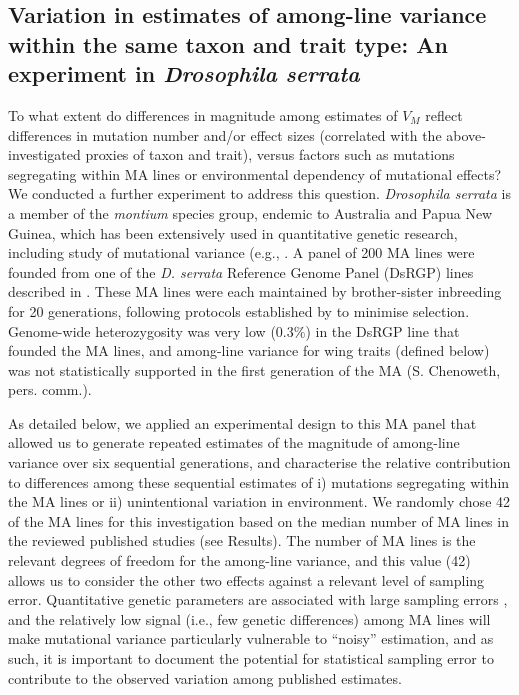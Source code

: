 \subsection{Variation in estimates of among-line variance within the same taxon and trait type: An experiment in \textit{Drosophila serrata}} 
To what extent do differences in magnitude among estimates of $V_M$ reflect differences in mutation number and/or effect sizes (correlated with the above-investigated proxies of taxon and trait), versus factors such as mutations segregating within MA lines or environmental dependency of mutational effects? We conducted a further experiment to address this question. \textit{Drosophila serrata} is a member of the \textit{montium} species group, endemic to Australia and Papua New Guinea, which has been extensively used in quantitative genetic research, including study of mutational variance (e.g., \citealp{McGu13,Hine18, Duga21}. A panel of 200 MA lines were founded from one of the \textit{D. serrata} Reference Genome Panel (DsRGP) lines described in \citet{Redd18}. These MA lines were each maintained by brother-sister inbreeding for 20 generations, following protocols established by \citet{McGu11a} to minimise selection. Genome-wide heterozygosity was very low (0.3\%) in the DsRGP line that founded the MA lines, and among-line variance for wing traits (defined below) was not statistically supported in the first generation of the MA (S. Chenoweth, pers. comm.).\par 

As detailed below, we applied an experimental design to this MA panel that allowed us to generate repeated estimates of the magnitude of among-line variance over six sequential generations, and characterise the relative contribution to differences among these sequential estimates of i) mutations segregating within the MA lines or ii) unintentional variation in environment. We randomly chose 42 of the MA lines for this investigation based on the median number of MA lines in the reviewed published studies (see Results). The number of MA lines is the relevant degrees of freedom for the among-line variance, and this value (42) allows us to consider the other two effects against a relevant level of sampling error. Quantitative genetic parameters are associated with large sampling errors \citep{Klei73,Klei74,Lync98}, and the relatively low signal (i.e., few genetic differences) among MA lines will make mutational variance particularly vulnerable to “noisy” estimation, and as such, it is important to document the potential for statistical sampling error to contribute to the observed variation among published estimates.\par

